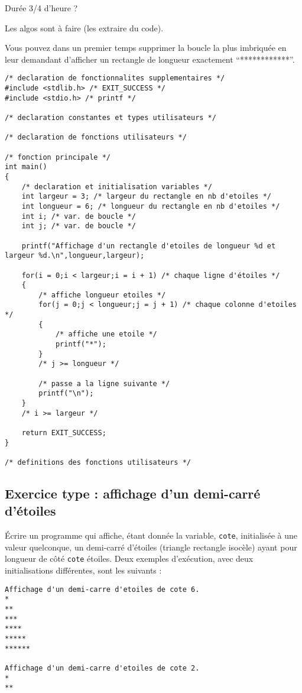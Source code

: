 \begin{correction}
Durée 3/4 d'heure ?

Les algos sont à faire (les extraire du code).

Vous pouvez dans un premier temps supprimer la boucle la plus imbriquée en leur demandant d'afficher un rectangle de longueur exactement ``************''.

\begin{verbatim}
/* declaration de fonctionnalites supplementaires */
#include <stdlib.h> /* EXIT_SUCCESS */
#include <stdio.h> /* printf */

/* declaration constantes et types utilisateurs */

/* declaration de fonctions utilisateurs */

/* fonction principale */
int main()
{
    /* declaration et initialisation variables */
    int largeur = 3; /* largeur du rectangle en nb d'etoiles */
    int longueur = 6; /* longueur du rectangle en nb d'etoiles */
    int i; /* var. de boucle */
    int j; /* var. de boucle */

    printf("Affichage d'un rectangle d'etoiles de longueur %d et largeur %d.\n",longueur,largeur);

    for(i = 0;i < largeur;i = i + 1) /* chaque ligne d'étoiles */
    {
        /* affiche longueur etoiles */
        for(j = 0;j < longueur;j = j + 1) /* chaque colonne d'etoiles */
        {
            /* affiche une etoile */
            printf("*");
        }
        /* j >= longueur */

        /* passe a la ligne suivante */
        printf("\n");
    }
    /* i >= largeur */

    return EXIT_SUCCESS;
}

/* definitions des fonctions utilisateurs */
\end{verbatim}
\end{correction}

\subsection{Exercice type : affichage d'un demi-carré d'étoiles}

Écrire un programme qui affiche, étant donnée la variable,
\verb|cote|, initialisée à une valeur quelconque, un demi-carré d'étoiles (triangle rectangle isocèle) ayant pour
longueur de côté \verb|cote| étoiles. Deux exemples d'exécution, avec deux initialisations
différentes, sont les suivants :
\begin{verbatim}
Affichage d'un demi-carre d'etoiles de cote 6.
*
**
***
****
*****
******

Affichage d'un demi-carre d'etoiles de cote 2.
*
**
\end{verbatim}

